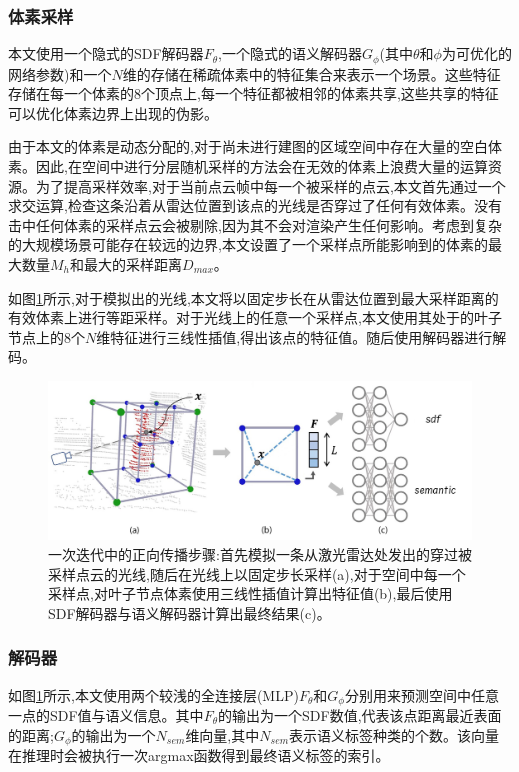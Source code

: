 \subsubsection{体素采样}
本文使用一个隐式的SDF解码器$F_\theta$,一个隐式的语义解码器$G_\phi$(其中$\theta$和$\phi$为可优化的网络参数)和一个$N$维的存储在稀疏体素中的特征集合来表示一个场景。这些特征存储在每一个体素的8个顶点上,每一个特征都被相邻的体素共享,这些共享的特征可以优化体素边界上出现的伪影。

由于本文的体素是动态分配的,对于尚未进行建图的区域空间中存在大量的空白体素。因此,在空间中进行分层随机采样的方法会在无效的体素上浪费大量的运算资源。为了提高采样效率,对于当前点云帧中每一个被采样的点云,本文首先通过一个求交运算,检查这条沿着从雷达位置到该点的光线是否穿过了任何有效体素。没有击中任何体素的采样点云会被剔除,因为其不会对渲染产生任何影响。考虑到复杂的大规模场景可能存在较远的边界,本文设置了一个采样点所能影响到的体素的最大数量$M_h$和最大的采样距离$D_{max}$。

如图\ref{shinemapping}所示,对于模拟出的光线,本文将以固定步长在从雷达位置到最大采样距离的有效体素上进行等距采样。对于光线上的任意一个采样点,本文使用其处于的叶子节点上的8个$N$维特征进行三线性插值,得出该点的特征值。随后使用解码器进行解码。
\begin{figure}[htbp]
    \includegraphics[scale = 0.3]{figures/shinemapping.png}
    \centering
    \caption{一次迭代中的正向传播步骤:首先模拟一条从激光雷达处发出的穿过被采样点云的光线,随后在光线上以固定步长采样(a),对于空间中每一个采样点,对叶子节点体素使用三线性插值计算出特征值(b),最后使用SDF解码器与语义解码器计算出最终结果(c)。}\label{shinemapping}
\end{figure}
\subsubsection{解码器}
如图\ref{shinemapping}所示,本文使用两个较浅的全连接层(MLP)$F_\theta$和$G_\phi$分别用来预测空间中任意一点的SDF值与语义信息。其中$F_\theta$的输出为一个SDF数值,代表该点距离最近表面的距离;$G_\phi$的输出为一个$N_{sem}$维向量,其中$N_{sem}$表示语义标签种类的个数。该向量在推理时会被执行一次argmax函数得到最终语义标签的索引。
